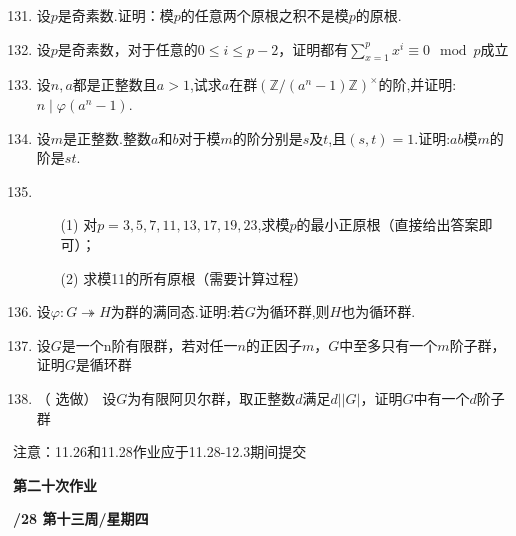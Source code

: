 \documentclass[a4paper,12pt]{article}
\begin{document}
\begin{enumerate}\setcounter{enumi}{130}
 \item 设$p$是奇素数.证明：模$p$的任意两个原根之积不是模$p$的原根.
 \item 设$p$是奇素数，对于任意的$0\leq i \leq p-2$，证明都有$\sum\limits_{x=1}^{p} x^i \equiv 0 \mod p$成立
 \item 设$n,a$都是正整数且$a>1$,试求$a$在群$(\mathbb{Z}/(a^n-1)\mathbb{Z})^\times$的阶,并证明:$n\mid \varphi(a^n-1)$.
 \item 设$m$是正整数.整数$a$和$b$对于模$m$的阶分别是$s$及$t$,且$(s,t)=1$.证明:$ab$模$m$的阶是$st$.
 \item \begin{itemize}
 \item[(1)]对$p=3,5,7,11,13,17,19,23$,求模$p$的最小正原根（直接给出答案即可）；
 \item[(2)]求模11的所有原根（需要计算过程）
 \end{itemize}
 \item 设$\varphi :G\twoheadrightarrow H$为群的满同态.证明:若$G$为循环群,则$H$也为循环群.
 \item 设$G$是一个n阶有限群，若对任一$n$的正因子$m$，$G$中至多只有一个$m$阶子群，证明$G$是循环群
 \item （{\color{red} 选做}） 设$G$为有限阿贝尔群，取正整数$d$满足$d||G|$，证明$G$中有一个$d$阶子群
\end{enumerate}

{\color{red} 注意：11.26和11.28作业应于11.28-12.3期间提交}

\newpage
\head

\begin{center} %
	{\Large \bf 第二十次作业} %
	\vspace{2mm}
	
	{\bf{}/28 \quad  第十三周/星期四} %
\end{center} 
\end{document}

